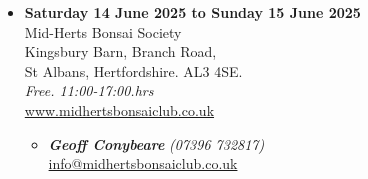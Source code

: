 \begin{itemize}
    \item \textbf{Saturday 14 June 2025 to Sunday 15 June 2025}
    \\
    Mid-Herts Bonsai Society \\
    Kingsbury Barn, Branch Road, \\
    St Albans, Hertfordshire. AL3 4SE.
    \\
    \emph{Free. 11:00-17:00.hrs}
    \\
    \href{https://www.midhertsbonsaiclub.co.uk}{www.midhertsbonsaiclub.co.uk}
    \begin{itemize}
        \item \textbf{\emph{Geoff Conybeare}} \emph{(07396 732817)} \\
        \href{mailto:info@midhertsbonsaiclub.co.uk}{info@midhertsbonsaiclub.co.uk} 
    \end{itemize}

\end{itemize}
\closearticle